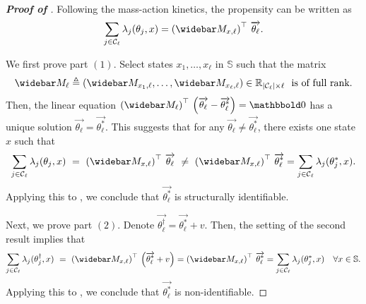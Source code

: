 \documentclass[pdflatex,sn-mathphys-num]{sn-jnl}%
\theoremstyle{thmstyleone}%
\theoremstyle{thmstyletwo}%
\theoremstyle{thmstylethree}%
\begin{document}
\begin{appendices}
\begin{proof}[\textbf{Proof of }]

Following the mass-action kinetics, the propensity can be written as 
\[
\sum_{j\in\mathcal C_\ell} \lambda_{j}(\theta_j,x) = \left(\widebar M_{x,\ell}\right)^{\top}\,\overrightarrow{\theta_\ell}.
\]
    
    We first prove part $(1)$. 
    Select states $x_1,\dots,x_\ell$ in $\mathbb S$ such that the matrix 
    \[
    \widebar M_{\ell} \triangleq \left(\widebar M_{x_1,\ell}, \dots,  \widebar M_{x_\ell,\ell}\right) \in \mathbb{R}_{\left|\mathcal C_\ell\right| \times \ell}
    \ \text{ is of full rank}.
    \]
    Then, the linear equation $\left(\widebar M_{\ell}\right)^{\top}\,\left(\overrightarrow{\theta_\ell}-\overrightarrow{\theta^*_\ell}\right) = \mathbbold 0$ has a unique solution $\overrightarrow{\theta_\ell} = \overrightarrow{\theta^*_\ell}$. 
    This suggests that for any $\overrightarrow{\theta_\ell} \neq \overrightarrow{\theta^*_\ell}$, there exists one state $x$ such that $$\sum_{j\in\mathcal C_\ell} \lambda_{j}(\theta_j,x) ~=~ \left(\widebar M_{x,\ell}\right)^{\top}\,\overrightarrow{\theta_\ell} 
    ~\neq~
    \left(\widebar M_{x,\ell}\right)^{\top}\,\overrightarrow{\theta^*_\ell}
    = \sum_{j\in\mathcal C_\ell} \lambda_{j}(\theta^*_j,x).
    $$
    Applying this to , we conclude that $\overrightarrow{\theta^*_\ell}$ is structurally identifiable. 

    Next, we prove part $(2)$. 
    Denote $\overrightarrow{\theta^\dagger_\ell} = \overrightarrow{\theta^*_\ell} +v$. 
    Then, the setting of the second result implies that
    \begin{align*}
        \sum_{j\in\mathcal C_\ell} \lambda_{j}(\theta^{\dagger}_j,x) ~=~ \left(\widebar M_{x,\ell}\right)^{\top}\,
        \left(\overrightarrow{\theta^*_\ell} + v \right)
        =
        \left(\widebar M_{x,\ell}\right)^{\top}\,\overrightarrow{\theta^*_\ell}
        = \sum_{j\in\mathcal C_\ell} \lambda_{j}(\theta^*_j,x)
        && \forall x\in\mathbb S.
    \end{align*}
    Applying this to , we conclude that $\overrightarrow{\theta^*_\ell}$ is non-identifiable. 


\end{proof}
\end{appendices}
\end{document}
